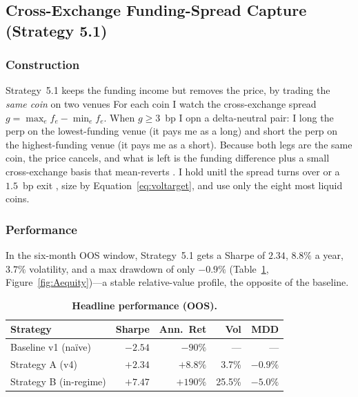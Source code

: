 \documentclass[10pt,twocolumn,a4paper]{article}
\begin{document}
\subsection{Cross-Exchange Funding-Spread Capture (Strategy 5.1)}
\label{sec:stratA}

\subsubsection{Construction}

Strategy~5.1 keeps the funding income but removes the price, by trading the \emph{same
coin} on two venues  For each coin I watch the cross-exchange spread
$g = \max_e f_{e} - \min_e f_{e}$.  When $g \ge 3$~bp I opn a delta-neutral pair: I
long the perp on the lowest-funding venue (it pays me as a long) and short the perp on
the highest-funding venue (it pays me as a short).  Because both legs are the same
coin, the price cancels, and what is left is the funding difference plus a small
cross-exchange basis that mean-reverts \cite{makarov2020trading}.  I hold unitl the
spread turns over or a $1.5$~bp exit \cite{foucault2017toxic}, size by
Equation~\eqref{eq:voltarget}, and use only the eight most liquid coins.

\subsubsection{Performance}

In the six-month OOS window, Strategy~5.1 gets a Sharpe of $\mathbf{2.34}$, $8.8\%$ a
year, $3.7\%$ volatility, and a max drawdown of only $-0.9\%$ (Table~\ref{tab:headline},
Figure~\ref{fig:Aequity})---a stable relative-value profile, the opposite of the
baseline.

\begin{table}[H]
  \centering
  \caption{\textbf{Headline performance (OOS).}}
  \label{tab:headline}
  \begin{tabular}{lrrrr}
    \toprule
    \textbf{Strategy} & \textbf{Sharpe} & \textbf{Ann.\ Ret} & \textbf{Vol} & \textbf{MDD} \\
    \midrule
    Baseline v1 (na\"ive)   & $-2.54$ & $-90\%$  & ---    & ---     \\
    Strategy A (v4)         & $+2.34$ & $+8.8\%$ & 3.7\%  & $-0.9\%$ \\
    Strategy B (in-regime)  & $+7.47$ & $+190\%$ & 25.5\% & $-5.0\%$ \\
    \bottomrule
  \end{tabular}
\end{table}
\end{document}
